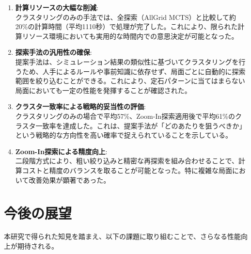 \documentclass[11pt,a4j]{jreport}
\begin{document}
\begin{enumerate}
    \item \textbf{計算リソースの大幅な削減}: \\
    クラスタリングのみの手法では、全探索（AllGrid MCTS）と比較して約20\%の計算時間（平均1110秒）で処理が完了した。これにより、限られた計算リソース環境においても実用的な時間内での意思決定が可能となった。
    
    \item \textbf{探索手法の汎用性の確保}: \\
    提案手法は、シミュレーション結果の類似性に基づいてクラスタリングを行うため、人手によるルールや事前知識に依存せず、局面ごとに自動的に探索範囲を絞り込むことができる。これにより、定石パターンに当てはまらない局面においても一定の性能を発揮することが確認された。
    
    \item \textbf{クラスタ一致率による戦略的妥当性の評価}: \\
    クラスタリングのみの場合で平均57\%、Zoom-In探索適用後で平均61\%のクラスタ一致率を達成した。これは、提案手法が「どのあたりを狙うべきか」という戦略的な方向性を高い確率で捉えられていることを示している。
    
    \item \textbf{Zoom-In探索による精度向上}: \\
    二段階方式により、粗い絞り込みと精密な再探索を組み合わせることで、計算コストと精度のバランスを取ることが可能となった。特に複雑な局面において改善効果が顕著であった。
\end{enumerate}

\section{今後の展望}
本研究で得られた知見を踏まえ、以下の課題に取り組むことで、さらなる性能向上が期待される。
\end{document}
